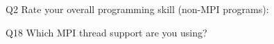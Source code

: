 \begin{description}%
\item{Q2} Rate your overall programming skill (non-MPI programs):%
\item{Q18} Which MPI thread support are you using?%
\end{description}%
